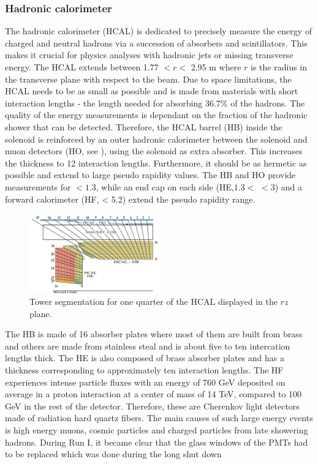 \subsubsection{Hadronic calorimeter}
The hadronic calorimeter (HCAL) is dedicated to precisely measure the energy of charged and neutral hadrons via a succession of absorbers and scintillators. This makes it crucial for physics analyses with hadronic jets or missing transverse energy. The HCAL extends between 1.77 $<r<$ 2.95 \si{ \meter} where $r$ is the radius in the transverse plane with respect to the beam. Due to space limitations, the HCAL needs to be as small as possible and is made from materials with short interaction lengths - the length needed for absorbing 36.7\% of the hadrons. The quality of the energy measurements is dependant on the fraction of the hadronic shower that can be detected. Therefore, the HCAL barrel (HB) inside the solenoid is reinforced by an outer hadronic calorimeter between the solenoid and muon detectors (HO, see ), using the solenoid as extra absorber. This increases the thickness to 12 interaction lengths. Furthermore, it should be as hermetic as possible and extend to large pseudo rapidity values. The HB and HO provide measurements for \abspsrap $<1.3$, while an end cap on each side (HE,$1.3<$ \abspsrap $<3$) and a forward calorimeter (HF, \abspsrap < 5.2) extend the pseudo rapidity range. 


\begin{figure}[ht]
	\centering
	\includegraphics[width=0.5\textwidth]{2_ExperimentalSetup/Figures/imageedit_12_3242046754}
	\caption{Tower segmentation for one quarter of the HCAL displayed in the $rz$ plane\cite{Chatrchyan:2008aa}.}
	\label{fig:HCAL}
\end{figure}

The HB is made of 16 absorber plates where most of them are built from brass and others are made from stainless steal and is about five to ten intercation lengths thick. The HE is also composed of brass absorber plates and has a thickness corresponding to approximately ten interaction lengths. 
The HF experiences intense particle fluxes with an energy of 760 \si{ \GeV} deposited on average in a proton interaction at a center of mass of 14 \si{ \TeV}, compared to 100 \si{ \GeV} in the rest of the detector. Therefore, these are Cherenkov light detectors made of radiation hard quartz fibers.
The main causes of such large energy events is high energy muons, cosmic particles and charged particles from late showering hadrons. During  Run I, it became clear that the glass windows of the PMTs had to be replaced which was done during the long shut down \cite{Tiras:2016ghv}
	

